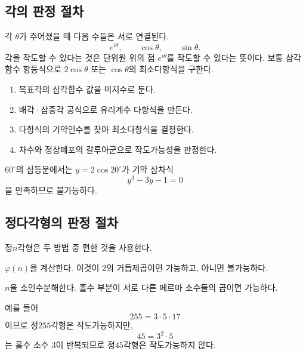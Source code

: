 \subsection{각의 판정 절차}

각 $\theta$가 주어졌을 때 다음 수들은 서로 연결된다.
\[
  e^{i\theta},\qquad \cos\theta,\qquad \sin\theta.
\]
각을 작도할 수 있다는 것은 단위원 위의 점 $e^{i\theta}$를 작도할 수 있다는 뜻이다. 보통 삼각함수 항등식으로 $2\cos\theta$ 또는 $\cos\theta$의 최소다항식을 구한다.

\begin{enumerate}[label=\textbf{단계 \arabic*.},leftmargin=28mm]
  \item 목표각의 삼각함수 값을 미지수로 둔다.
  \item 배각·삼중각 공식으로 유리계수 다항식을 만든다.
  \item 다항식의 기약인수를 찾아 최소다항식을 결정한다.
  \item 차수와 정상폐포의 갈루아군으로 작도가능성을 판정한다.
\end{enumerate}

$60^\circ$의 삼등분에서는 $y=2\cos20^\circ$가 기약 삼차식
\[
  y^3-3y-1=0
\]
을 만족하므로 불가능하다.

\subsection{정다각형의 판정 절차}

정$n$각형은 두 방법 중 편한 것을 사용한다.

\begin{description}[leftmargin=34mm,style=nextline]
  \item[오일러 함수 방법]
  $\varphi(n)$을 계산한다. 이것이 $2$의 거듭제곱이면 가능하고, 아니면 불가능하다.

  \item[소인수분해 방법]
  $n$을 소인수분해한다. 홀수 부분이 서로 다른 페르마 소수들의 곱이면 가능하다.
\end{description}

예를 들어
\[
  255=3\cdot5\cdot17
\]
이므로 정$255$각형은 작도가능하지만,
\[
  45=3^2\cdot5
\]
는 홀수 소수 $3$이 반복되므로 정$45$각형은 작도가능하지 않다.

